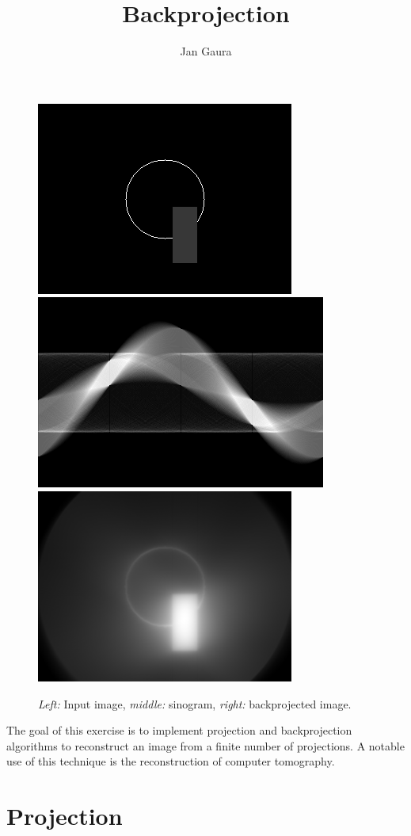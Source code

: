 \documentclass{tufte-handout}
\title{Backprojection}
\author[Jan Gaura]{Jan Gaura}
\begin{document}
\maketitle%

\begin{figure}[h]
  \includegraphics[width=0.3\linewidth]{images/input.png}
  \includegraphics[width=0.337\linewidth]{images/sinogram.png}
  \includegraphics[width=0.3\linewidth]{images/backprojected.png}
  \caption{\emph{Left:} Input image, \emph{middle:} sinogram, \emph{right:} backprojected image.
  }%
  \label{fig:title}%
\end{figure}



The goal of this exercise is to implement projection and backprojection algorithms
to reconstruct an image from a finite number of projections\cite{wiki-tomographic-reconstruction}.
A notable use of this technique is the reconstruction of computer tomography.

\section{Projection}
\end{document}
